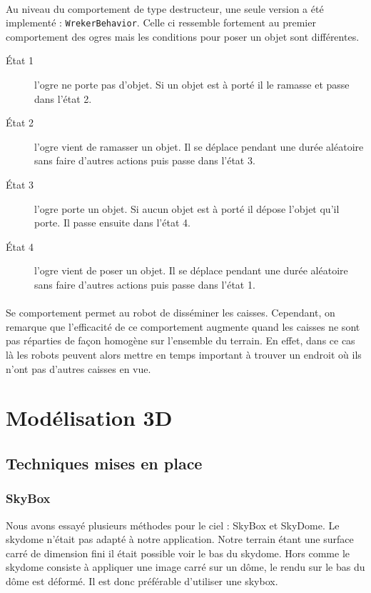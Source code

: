 \paragraph{}Au niveau du comportement de type destructeur, une seule version a
été implementé : \texttt{WrekerBehavior}. Celle ci ressemble fortement au premier comportement des
ogres mais les conditions pour poser un objet sont différentes. 

\begin{description}
    \item[\'Etat 1] l'ogre ne porte pas d'objet. Si un objet est à porté il
        le ramasse et passe dans l'état 2.
    \item[\'Etat 2] l'ogre vient de ramasser un objet. Il se déplace pendant une
        durée aléatoire sans faire d'autres actions puis passe dans l'état 3.
    \item[\'Etat 3] l'ogre porte un objet. Si aucun objet est à porté il
        dépose l'objet qu'il porte. Il passe ensuite dans
        l'état 4.
    \item[\'Etat 4] l'ogre vient de poser un objet. Il se déplace pendant une
        durée aléatoire sans faire d'autres actions puis passe dans l'état 1.
\end{description}

\paragraph{}Se comportement permet au robot de disséminer les caisses.
Cependant, on remarque que l'efficacité de ce comportement augmente quand les
caisses ne sont pas réparties de façon homogène sur l'ensemble du terrain. En
effet, dans ce cas là les robots peuvent alors mettre en temps important à
trouver un endroit où ils n'ont pas d'autres caisses en vue. 

\section{Modélisation 3D}


\subsection{Techniques mises en place}
\subsubsection{SkyBox}
Nous avons essayé plusieurs méthodes pour le ciel : SkyBox et SkyDome. Le
skydome n'était pas adapté à notre application. Notre terrain étant une
surface carré de dimension fini il était possible voir le bas du skydome.
Hors comme le skydome consiste à appliquer une image carré sur un dôme, le
rendu sur le bas du dôme est déformé. Il est donc préférable d'utiliser une
skybox.

